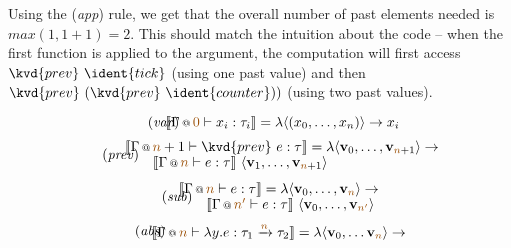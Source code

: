 Using the (\emph{app}) rule, we get that the overall number of past elements needed is
$\mathit{max}(1, 1+1) = 2$. This should match the intuition about the code -- when the first function
is applied to the argument, the computation will first access $\kvd{prev}~\ident{tick}$ (using one
past value) and then $\kvd{prev}~(\kvd{prev}~\ident{counter}))$ (using two past values).


\begin{figure}
\begin{equation}
\tag{\emph{var}}
\hspace{-1em}
\sem{\coctx{\Gamma}{\aclrd{0}} \vdash x_i : \tau_i} = \lambda \langle(x_0, \ldots, x_n)\rangle \rightarrow x_i
\end{equation}
\vspace{-1.0em}
\begin{equation}
\tag{\emph{prev}}
\hspace{-1.5em}
\begin{array}{l}
\sem{\coctx{\Gamma}{\aclrd{n}+1} \vdash \kvd{prev}~e : \tau} = \lambda \langle \mathbf{v}_0, \ldots, \mathbf{v}_{\aclrd{n}+1} \rangle \rightarrow\\[-0.1em]
  \qquad\sem{ \coctx{\Gamma}{ \aclrd{n} } \vdash e : \tau }~\langle \mathbf{v}_1, \ldots, \mathbf{v}_{ \aclrd{n}+1 }\rangle
\end{array}
\end{equation}
\vspace{-0.5em}
\begin{equation}
\tag{\emph{sub}}
\hspace{-1.5em}
\begin{array}{l}
\sem{\coctx{\Gamma}{\aclrd{n}} \vdash e : \tau} = \lambda \langle \mathbf{v}_0, \ldots, \mathbf{v}_{\aclrd{n}} \rangle \rightarrow\\[-0.1em]
  \qquad\sem{ \coctx{\Gamma}{ \aclrd{n'} } \vdash e : \tau }~\langle \mathbf{v}_0, \ldots, \mathbf{v}_{ \aclrd{n'} }\rangle
\end{array}
\end{equation}
\vspace{-0.5em}
\begin{equation}
\tag{\emph{abs}}
\hspace{-1.5em}
\begin{array}{l}
  \sem{\coctx{\Gamma}{\aclrd{n}} \vdash \lambda y. e : \tau_1 \xrightarrow{\aclrd{n}} \tau_2 } = 
    \lambda \langle \mathbf{v}_0, \ldots \mathbf{v}_{\aclrd{n}} \rangle \rightarrow\\[-0.1em]

\end{array}
\end{equation}
\end{figure}
